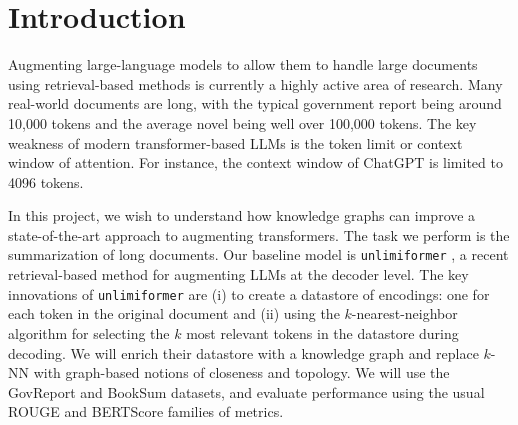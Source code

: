 \section*{Introduction}
 Augmenting large-language models to allow them to handle large documents using retrieval-based methods is currently a highly active area of research. Many real-world documents are long, with the typical government report being around 10,000 tokens and the average novel being well over 100,000 tokens. The key weakness of modern transformer-based LLMs is the token limit or context window of attention. For instance, the context window of ChatGPT is limited to 4096 tokens.

In this project, we wish to understand how knowledge graphs can improve a state-of-the-art approach to augmenting transformers. The task we perform is the summarization of long documents. Our baseline model is \texttt{unlimiformer} \cite{bertsch2023unlimiformer}, a recent retrieval-based method for augmenting LLMs at the decoder level. The key innovations of \texttt{unlimiformer} are (i) to create a datastore of encodings: one for each token in the original document and (ii) using the $k$-nearest-neighbor algorithm for selecting the $k$ most relevant tokens in the datastore during decoding. We will enrich their datastore with a knowledge graph and replace $k$-NN with graph-based notions of closeness and topology. We will use the GovReport and BookSum datasets, and evaluate performance using the usual ROUGE and BERTScore families of metrics.